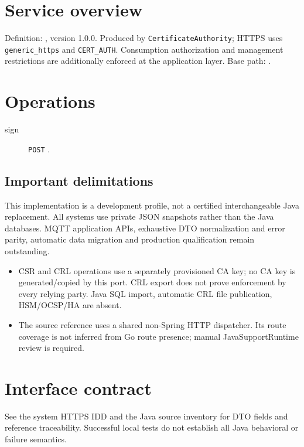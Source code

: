 \documentclass[a4paper]{arrowhead}
\begin{document}
\ArrowheadSetup
\section{Service overview}
Definition: , version 1.0.0. Produced by \texttt{CertificateAuthority}; HTTPS uses \texttt{generic\_https} and \texttt{CERT\_AUTH}. Consumption authorization and management restrictions are additionally enforced at the application layer. Base path: .
\section{Operations}
\begin{description}
\item[sign] \texttt{POST} .
\end{description}
\subsection{Important delimitations}
This implementation is a development profile, not a certified interchangeable Java replacement. All systems use private JSON snapshots rather than the Java databases. MQTT application APIs, exhaustive DTO normalization and error parity, automatic data migration and production qualification remain outstanding.
\begin{itemize}
\item CSR and CRL operations use a separately provisioned CA key; no CA key is generated/copied by this port. CRL export does not prove enforcement by every relying party. Java SQL import, automatic CRL file publication, HSM/OCSP/HA are absent.
\item The source reference uses a shared non-Spring HTTP dispatcher. Its route coverage is not inferred from Go route presence; manual JavaSupportRuntime review is required.
\end{itemize}
\section{Interface contract}
See the system HTTPS IDD and the Java source inventory for DTO fields and reference traceability. Successful local tests do not establish all Java behavioral or failure semantics.
\end{document}

